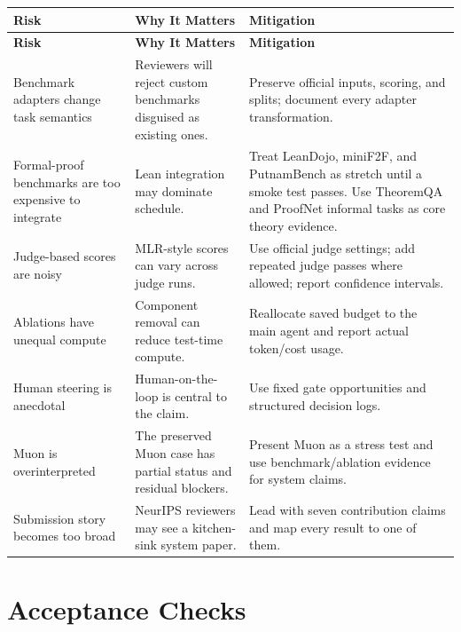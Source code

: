 \documentclass[11pt]{article}
\begin{document}
\begin{longtable}{>{\raggedright\arraybackslash}p{} >{\raggedright\arraybackslash}p{} >{\raggedright\arraybackslash}p{}}
\toprule
\textbf{Risk} & \textbf{Why It Matters} & \textbf{Mitigation} \\
\midrule
\endfirsthead
\toprule
\textbf{Risk} & \textbf{Why It Matters} & \textbf{Mitigation} \\
\midrule
\endhead
Benchmark adapters change task semantics & Reviewers will reject custom benchmarks disguised as existing ones. & Preserve official inputs, scoring, and splits; document every adapter transformation. \\
Formal-proof benchmarks are too expensive to integrate & Lean integration may dominate schedule. & Treat LeanDojo, miniF2F, and PutnamBench as stretch until a smoke test passes. Use TheoremQA and ProofNet informal tasks as core theory evidence. \\
Judge-based scores are noisy & MLR-style scores can vary across judge runs. & Use official judge settings; add repeated judge passes where allowed; report confidence intervals. \\
Ablations have unequal compute & Component removal can reduce test-time compute. & Reallocate saved budget to the main agent and report actual token/cost usage. \\
Human steering is anecdotal & Human-on-the-loop is central to the claim. & Use fixed gate opportunities and structured decision logs. \\
Muon is overinterpreted & The preserved Muon case has partial status and residual blockers. & Present Muon as a stress test and use benchmark/ablation evidence for system claims. \\
Submission story becomes too broad & NeurIPS reviewers may see a kitchen-sink system paper. & Lead with seven contribution claims and map every result to one of them. \\
\bottomrule
\end{longtable}

\section*{Acceptance Checks}
\end{document}
